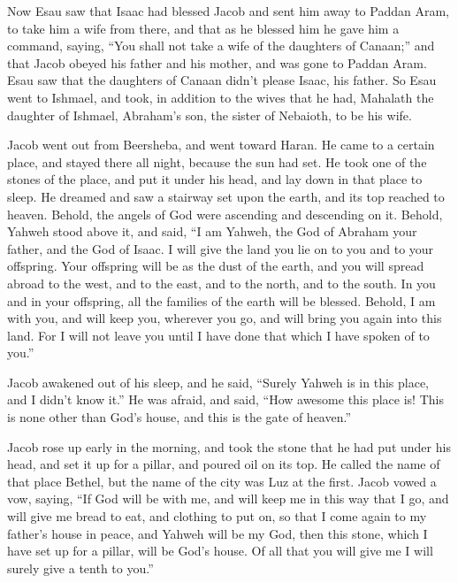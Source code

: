  Now Esau saw that Isaac had blessed Jacob and sent him
away to Paddan Aram, to take him a wife from there, and that as he
blessed him he gave him a command, saying, ``You shall not take a wife
of the daughters of Canaan;''  and that Jacob obeyed his
father and his mother, and was gone to Paddan Aram.  Esau
saw that the daughters of Canaan didn't please Isaac, his father.
 So Esau went to Ishmael, and took, in addition to the
wives that he had, Mahalath the daughter of Ishmael, Abraham's son, the
sister of Nebaioth, to be his wife.

 Jacob went out from Beersheba, and went toward Haran.
 He came to a certain place, and stayed there all night,
because the sun had set. He took one of the stones of the place, and put
it under his head, and lay down in that place to sleep. 
He dreamed and saw a stairway set upon the earth, and its top reached to
heaven. Behold, the angels of God were ascending and descending on it.
 Behold, Yahweh stood above it, and said, ``I am Yahweh,
the God of Abraham your father, and the God of Isaac. I will give the
land you lie on to you and to your offspring.  Your
offspring will be as the dust of the earth, and you will spread abroad
to the west, and to the east, and to the north, and to the south. In you
and in your offspring, all the families of the earth will be blessed.
 Behold, I am with you, and will keep you, wherever you
go, and will bring you again into this land. For I will not leave you
until I have done that which I have spoken of to you.''

 Jacob awakened out of his sleep, and he said, ``Surely
Yahweh is in this place, and I didn't know it.''  He was
afraid, and said, ``How awesome this place is! This is none other than
God's house, and this is the gate of heaven.''

 Jacob rose up early in the morning, and took the stone
that he had put under his head, and set it up for a pillar, and poured
oil on its top.  He called the name of that place Bethel,
but the name of the city was Luz at the first.  Jacob
vowed a vow, saying, ``If God will be with me, and will keep me in this
way that I go, and will give me bread to eat, and clothing to put on,
 so that I come again to my father's house in peace, and
Yahweh will be my God,  then this stone, which I have set
up for a pillar, will be God's house. Of all that you will give me I
will surely give a tenth to you.''

